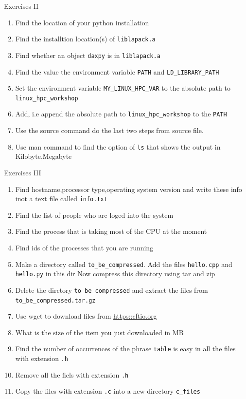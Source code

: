 \documentclass{beamer}
\begin{document}
\begin{frame}{Exercises II}
  \fontsize{8pt}{8}\selectfont
  \begin{enumerate}
    \item Find the location of your python installation
    \item Find the installtion location(s) of \texttt{liblapack.a}
    \item Find whether an object \texttt{daxpy} is in \texttt{liblapack.a}
    \item Find the value the environment variable \texttt{PATH} and \texttt{LD\_LIBRARY\_PATH}
    \item Set the environment variable \texttt{MY\_LINUX\_HPC\_VAR} to the absolute path to \texttt{linux\_hpc\_workshop}
    \item Add, i.e append the absolute path to \texttt{linux\_hpc\_workshop} to the \texttt{PATH}
    \item Use the source command do the last two steps from source file.
    \item Use man command to find the option of \texttt{ls} that shows the output in Kilobyte,Megabyte
  \end{enumerate}
\end{frame}

\begin{frame}{Exercises III}
  \fontsize{8pt}{8}\selectfont
  \begin{enumerate}
    \item Find hostname,processor type,operating system version and write these info inot a text file called \texttt{info.txt}
    \item Find the list of people who are loged into the system
    \item Find the process that is taking most of the CPU at the moment
    \item Find ids of the processes that you are running
    \item Make a directory called \texttt{to\_be\_compressed}. Add the files \texttt{hello.cpp} and \texttt{hello.py} in this dir
    Now compress this directory using tar and zip
    \item Delete the dirctory \texttt{to\_be\_compressed} and extract the files from \texttt{to\_be\_compressed.tar.gz}
    \item Use wget to download  files from \url{https::cftio.org}
    \item What is the size of the item you just downloaded in MB
    \item Find the number of occurrences of the phrase \texttt{table} is easy in all the files with extension \texttt{.h}
    \item Remove all the fiels with extension \texttt{.h}
    \item Copy the files with extension \texttt{.c} into a new directory \texttt{c\_files}
  \end{enumerate}
\end{frame}
\end{document}
